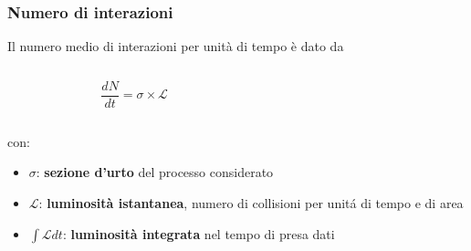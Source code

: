 \documentclass{beamer}
\begin{document}
\begin{frame}[t]
\frametitle{Numero di interazioni}


Il numero medio di interazioni per unit\`a di tempo \`e dato da\\
\medskip

\begin{columns}
\begin{column}{0.4\textwidth}
$$
\frac{dN}{dt} =\sigma \times \mathcal{L}
$$
\end{column}
\begin{column}{0.6\textwidth}
\end{column}
\end{columns}
\medskip
con:\\
\begin{itemize}
\item $\sigma$: \textbf{sezione d'urto} del processo considerato
\item $\mathcal{L}$: \textbf{luminosit\`a istantanea}, numero di collisioni 
per unit\'a di tempo e di area
\item $\int\mathcal{L}dt$: \textbf{luminosit\`a integrata} nel tempo di presa dati
\end{itemize}
\bigskip 

\end{frame}

\end{document}
